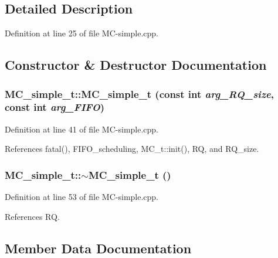 \subsection{Detailed Description}


Definition at line 25 of file MC-simple.cpp.

\subsection{Constructor \& Destructor Documentation}
\subsubsection[{MC\_\-simple\_\-t}]{\setlength{\rightskip}{0pt plus 5cm}MC\_\-simple\_\-t::MC\_\-simple\_\-t (const int {\em arg\_\-RQ\_\-size}, \/  const int {\em arg\_\-FIFO})\hspace{0.3cm}{\tt  [inline]}}\label{classMC__simple__t_fe1dc1a5b0a17bf3d39d131071010e89}




Definition at line 41 of file MC-simple.cpp.

References fatal(), FIFO\_\-scheduling, MC\_\-t::init(), RQ, and RQ\_\-size.
\subsubsection[{$\sim$MC\_\-simple\_\-t}]{\setlength{\rightskip}{0pt plus 5cm}MC\_\-simple\_\-t::$\sim$MC\_\-simple\_\-t ()\hspace{0.3cm}{\tt  [inline]}}\label{classMC__simple__t_2cd23e2822d877f6ad21b1923518af3a}




Definition at line 53 of file MC-simple.cpp.

References RQ.

\subsection{Member Data Documentation}
